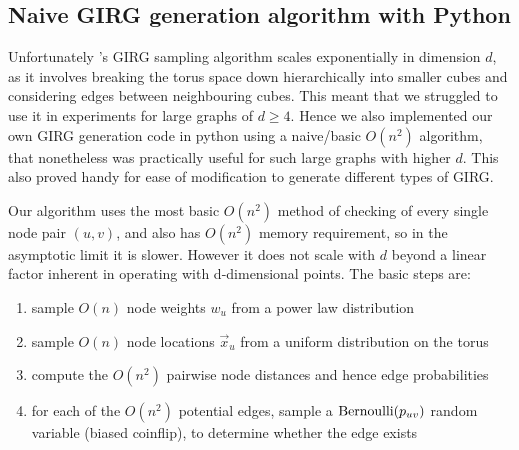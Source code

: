 \subsection{Naive GIRG generation algorithm with Python}
Unfortunately \cite{blasius2022efficiently}'s GIRG sampling algorithm scales exponentially in dimension $d$, as it involves breaking the torus space down hierarchically into smaller cubes and considering edges between neighbouring cubes. This meant that we struggled to use it in experiments for large graphs of $d \geq 4$.
Hence we also implemented our own GIRG generation code in python using a naive/basic $O(n^2)$ algorithm, that nonetheless was practically useful for such large graphs with higher $d$. This also proved handy for ease of modification to generate different types of GIRG.


Our algorithm uses the most basic $O(n^2)$ method of checking of every single node pair $(u, v)$, and also has $O(n^2)$ memory requirement, so in the asymptotic limit it is slower. However it does not scale with $d$ beyond a linear factor inherent in operating with d-dimensional points. The basic steps are:
\begin{enumerate}
    \item sample $O(n)$ node weights $w_u$ from a power law distribution
    \item sample $O(n)$ node locations $\vec{x}_u$ from a uniform distribution on the torus
    \item compute the $O(n^2)$ pairwise node distances and hence edge probabilities
    \item for each of the $O(n^2)$ potential edges, sample a $\operatorname{Bernoulli}(p_{uv})$ random variable (biased coinflip), to determine whether the edge exists
\end{enumerate}




